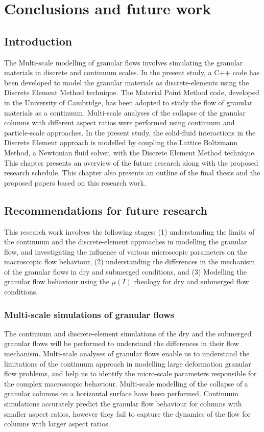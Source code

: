 \chapter{Conclusions and future work}

\ifpdf
    \graphicspath{{Chapter7/figs/raster/}{Chapter7/figs/pdf/}{Chapter7/figs/}}
\else
    \graphicspath{{Chapter7/figs/vector/}{Chapter7/figs/}}
\fi
\section{Introduction}
The Multi-scale modelling of granular flows 
involves simulating the granular 
materials in discrete and continuum scales. In 
the present study, a C++ code 
has been developed to model the granular 
materials as discrete-elements using 
the Discrete Element Method technique. The 
Material Point Method code, 
developed in 
the University of Cambridge, has been adopted to 
study the flow of granular 
materials as a continuum. Multi-scale analyses 
of the collapse of the granular columns with 
different aspect ratios were 
performed using continuum and particle-scale 
approaches. In the present study, 
the solid-fluid interactions in the Discrete 
Element approach is modelled by 
coupling the Lattice Boltzmann Method, a 
Newtonian fluid solver, with the 
Discrete Element Method technique. This chapter 
presents an overview of the 
future 
research along with the proposed research 
schedule. This chapter also presents 
an outline of the final thesis and the proposed 
papers based on this research 
work. 


\section{Recommendations for future research}
This research work involves the following stages: 
(1) understanding the limits 
of the continuum and the discrete-element 
approaches in modelling the granular 
flow, and investigating the influence of various 
microscopic parameters on the 
macroscopic flow behaviour, (2) understanding the 
differences in the mechanism 
of the granular flows in dry and submerged 
conditions, and (3) Modelling the 
granular flow behaviour using the $\mu(I)$ 
rheology for dry and submerged flow 
conditions.

\subsection{Multi-scale simulations of granular 
flows}
The continuum and discrete-element simulations of 
the dry and the submerged 
granular flows will be performed to understand 
the differences in their flow 
mechanism. Multi-scale analyses of granular flows 
enable us to understand the 
limitations of the continuum approach in 
modelling large deformation granular 
flow problems, and help us to identify the 
micro-scale parameters responsible 
for the complex macroscopic behaviour. 
Multi-scale modelling of the collapse of 
a granular columns on a horizontal surface have 
been performed. Continuum 
simulations accurately predict the granular flow 
behaviour for columns with 
smaller aspect ratios, however they fail to 
capture the dynamics of the flow 
for columns with larger aspect ratios. 

